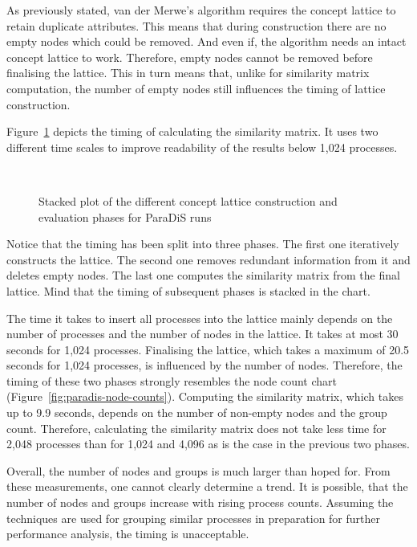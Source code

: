 \documentclass[a4paper, final, diplominf]{zih-template}
\begin{document}
As previously stated, van der Merwe's algorithm requires the concept lattice to retain duplicate attributes.
This means that during construction there are no empty nodes which could be removed.
And even if, the algorithm needs an intact concept lattice to work.
Therefore, empty nodes cannot be removed before finalising the lattice.
This in turn means that, unlike for similarity matrix computation, the number of empty nodes still influences the timing of lattice construction.

Figure~\ref{fig:paradis-lattice-timing} depicts the timing of calculating the similarity matrix.
It uses two different time scales to improve readability of the results below 1,024 processes.
\begin{figure}[p]
	\centering
	
	\vspace{2.7cm} \\
	
	\caption{Stacked plot of the different concept lattice construction and evaluation phases for ParaDiS runs}
	\label{fig:paradis-lattice-timing}
\end{figure}
Notice that the timing has been split into three phases.
The first one iteratively constructs the lattice.
The second one removes redundant information from it and deletes empty nodes.
The last one computes the similarity matrix from the final lattice.
Mind that the timing of subsequent phases is stacked in the chart.

The time it takes to insert all processes into the lattice mainly depends on the number of processes and the number of nodes in the lattice.
It takes at most 30 seconds for 1,024 processes.
Finalising the lattice, which takes a maximum of 20.5 seconds for 1,024 processes, is influenced by the number of nodes.
Therefore, the timing of these two phases strongly resembles the node count chart (Figure~\ref{fig:paradis-node-counts}).
Computing the similarity matrix, which takes up to 9.9 seconds, depends on the number of non-empty nodes and the group count.
Therefore, calculating the similarity matrix does not take less time for 2,048 processes than for 1,024 and 4,096 as is the case in the previous two phases.

Overall, the number of nodes and groups is much larger than hoped for.
From these measurements, one cannot clearly determine a trend.
It is possible, that the number of nodes and groups increase with rising process counts.
Assuming the techniques are used for grouping similar processes in preparation for further performance analysis, the timing is unacceptable.
\end{document}
